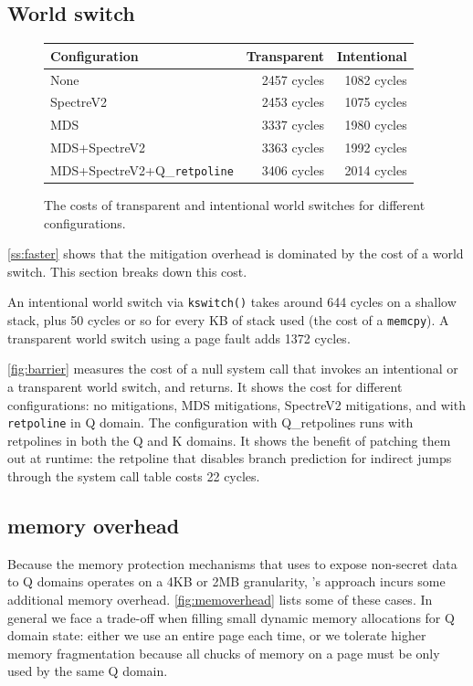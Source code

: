 \subsection{World switch}
\label{ss:world}

\begin{figure}
\small
\centering
\begin{tabular}{lrr}
  {\bf Configuration}
  & {\bf Transparent} & {\bf Intentional} \\
\midrule
None & 2457 cycles & 1082 cycles \\
SpectreV2 & 2453 cycles & 1075 cycles \\
MDS & 3337 cycles & 1980 cycles \\
MDS+SpectreV2 & 3363 cycles & 1992 cycles \\
MDS+SpectreV2+Q\_\texttt{retpoline} & 3406 cycles & 2014 cycles \\
\end{tabular}
\caption{The costs of transparent and intentional world switches for
  different configurations.}
\label{fig:barrier}
\end{figure}

\autoref{ss:faster} shows that the mitigation overhead is dominated by
the cost of a world switch.  This section breaks down this cost.

An intentional world switch via \texttt{kswitch()} takes around 644
cycles on a shallow stack, plus 50 cycles or so for every KB of stack
used (the cost of a \texttt{memcpy}). A transparent world switch using a page
fault adds 1372 cycles.

\autoref{fig:barrier} measures the cost of a null system call that
invokes an intentional or a transparent world switch, and returns.  It
shows the cost for different configurations: no mitigations, MDS
mitigations, SpectreV2 mitigations, and with \texttt{retpoline} in Q
domain.  The configuration with Q\_retpolines runs with retpolines
in both the Q and K domains. It shows the benefit of \sys patching
them out at runtime: the retpoline that disables branch prediction
for indirect jumps through the system call table costs 22 cycles.


\subsection{\sys memory overhead}
\label{ss:memoverhead}

Because the memory protection mechanisms that \sys uses to expose non-secret
data to Q domains operates on a 4KB or 2MB granularity, \sys's approach incurs
some additional memory overhead. \autoref{fig:memoverhead} lists some of
these cases. In general we face a trade-off when filling small dynamic memory
allocations for Q domain state: either we use an entire page each time, or we
tolerate higher memory fragmentation because all chucks of memory on a page must
be only used by the same Q domain.

